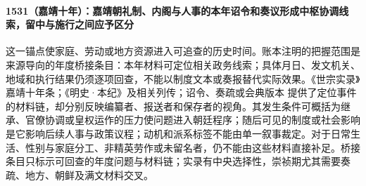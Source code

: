 \paragraph{1531（嘉靖十年）：嘉靖朝礼制、内阁与人事的本年诏令和奏议形成中枢协调线索，留中与施行之间应予区分} 这一锚点使家庭、劳动或地方资源进入可追查的历史时间。账本注明的把握范围是来源导向的年度桥接条目：本年材料可定位相关政务线索；具体月日、发文机关、地域和执行结果仍须逐项回查，不能以制度文本或奏报替代实际效果。《世宗实录》嘉靖十年条；《明史·本纪》及相关列传；诏令、奏疏或会典版本 提供了定位事件的材料链，却分别反映编纂者、报送者和保存者的视角。其发生条件可概括为继承、官僚协调或皇权运作的压力使问题进入朝廷程序；随后可见的制度或社会影响是它影响后续人事与政策议程；动机和派系标签不能由单一叙事裁定。对于日常生活、性别与家庭分工、非精英劳作或未留名者，仍不能由这些材料直接补足。桥接条目只标示可回查的年度问题与材料链；实录有中央选择性，崇祯期尤其需要奏疏、地方、朝鲜及满文材料交叉。
